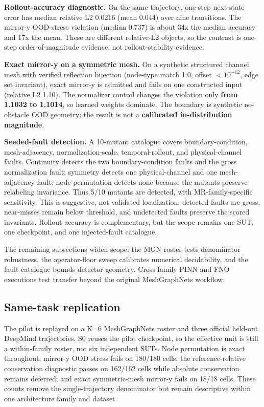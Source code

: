 \documentclass[preprint,12pt,authoryear]{elsarticle}
\begin{document}
\textbf{Rollout-accuracy diagnostic.} On the same trajectory, one-step next-state error has median relative L2 0.0216 (mean 0.044) over nine transitions. The mirror-y OOD-stress violation (median 0.737) is about 34x the median accuracy and 17x the mean. These are different relative-L2 objects, so the contrast is one-step order-of-magnitude evidence, not rollout-stability evidence.

\textbf{Exact mirror-y on a symmetric mesh.} On a synthetic structured channel mesh with verified reflection bijection (node-type match 1.0, offset $<10^{-12}$, edge set invariant), exact mirror-y is admitted and fails on one constructed input (relative L2 1.10). The normalizer control changes the violation only \textbf{from 1.1032 to 1.1014}, so learned weights dominate. The boundary is synthetic no-obstacle OOD geometry: the result is not a \textbf{calibrated in-distribution magnitude}.

\textbf{Seeded-fault detection.} A 10-mutant catalogue covers boundary-condition, mesh-adjacency, normalization-scale, temporal-rollout, and physical-channel faults. Continuity detects the two boundary-condition faults and the gross normalization fault; symmetry detects one physical-channel and one mesh-adjacency fault; node permutation detects none because the mutants preserve relabeling invariance. Thus 5/10 mutants are detected, with MR-family-specific sensitivity. This is suggestive, not validated localization: detected faults are gross, near-misses remain below threshold, and undetected faults preserve the scored invariants. Rollout accuracy is complementary, but the scope remains one SUT, one checkpoint, and one injected-fault catalogue.

The remaining subsections widen scope: the MGN roster tests denominator robustness, the operator-floor sweep calibrates numerical decidability, and the fault catalogue bounds detector geometry. Cross-family PINN and FNO executions test transfer beyond the original MeshGraphNets workflow.

\subsection{Same-task replication}
\label{subsec:multicheckpoint-replication}

The pilot is replayed on a K=6 MeshGraphNets roster and three official held-out DeepMind trajectories. S0 reuses the pilot checkpoint, so the effective unit is still a within-family roster, not six independent SUTs. Node permutation is exact throughout; mirror-y OOD stress fails on 180/180 cells; the reference-relative conservation diagnostic passes on 162/162 cells while absolute conservation remains deferred; and exact symmetric-mesh mirror-y fails on 18/18 cells. These counts remove the single-trajectory denominator but remain descriptive within one architecture family and dataset.
\end{document}
